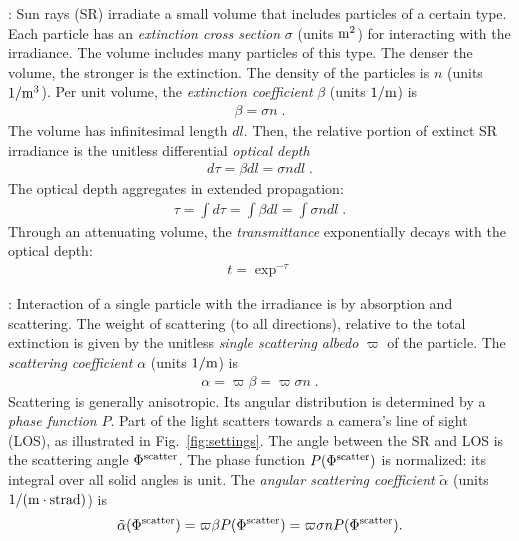 \documentclass[10pt,twocolumn,letterpaper]{article}
\begin{document}
:
Sun rays (SR) irradiate a small volume that includes particles of a certain type.
Each particle has an {\em extinction cross section} $\sigma$ (units ${\rm m}^2$)
for interacting with the irradiance. The volume includes
many particles of this type. The denser the volume, the stronger is the extinction.
The density of the particles is $n$ (units $1/{\rm m}^3$). Per unit volume, the {\em extinction coefficient} $\beta$ (units $1/{\rm m}$) is
\begin{align}
  \beta= \sigma n
  \;.
  \label{eq:extinctc}
\end{align}
The volume has infinitesimal length $dl$. Then, the relative portion of extinct SR irradiance is the unitless differential {\em optical depth}
\begin{align}
  d\tau= \beta dl=\sigma n dl
  \;.
  \label{eq:extinct}
\end{align}
The optical depth aggregates in extended propagation:
\begin{align}
  \tau= \int d\tau=\int \beta dl=\int \sigma n dl
  \;.
  \label{eq:tau}
\end{align}
Through an attenuating volume, the {\em transmittance} exponentially decays with the optical depth:
\begin{align}
  t=\exp^{-\tau}
  \label{eq:beer-lambert}
\end{align}


: Interaction of a single particle with the irradiance
is by absorption and scattering. The weight of scattering (to all directions), relative to the total extinction is given by the unitless {\em single scattering albedo} $\varpi$ of the particle. The {\em scattering coefficient} $\alpha$ (units $1/{\rm m}$) is
\begin{align}
  \alpha= \varpi\beta=\varpi \sigma n
  \;.
  \label{eq:alph}
\end{align}
Scattering is generally anisotropic. Its angular distribution is determined by
a {\em phase function} $P$. Part of the light scatters towards a camera's line of sight (LOS), as illustrated in
Fig.~\ref{fig:settings}. The angle between the SR and LOS is the scattering angle $\Phi^{\rm scatter}$. The phase function
$P(\Phi^{\rm scatter})$ is normalized: its integral over all solid angles is unit. The {\em angular scattering coefficient}
$\tilde\alpha$ (units $1/({\rm m}\cdot{{\rm strad}})$) is
\begin{align}
  \tilde\alpha(\Phi^{\rm scatter})
  = \varpi\beta P(\Phi^{\rm scatter})
  = \varpi \sigma n P(\Phi^{\rm scatter}).
  \label{eq:alphabasic}
\end{align}
\end{document}
